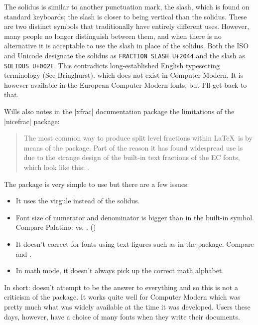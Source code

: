 {The solidus is similar to another punctuation mark, the slash, which is found on standard keyboards; the slash is closer to being vertical than the solidus. These are two distinct symbols that traditionally have entirely different uses. However, many people no longer distinguish between them, and when there is no alternative it is acceptable to use the slash in place of the solidus.
Both the ISO and Unicode designate the solidus as \texttt{FRACTION SLASH U+2044} and the slash as \texttt{SOLIDUS U+002F}. This contradicts long-established English typesetting terminology (See Bringhurst).
  which does not exist in Computer Modern. It is however available in
  the European Computer Modern fonts, but I'll get back to that.

Wills also notes in the |xfrac| documentation package the limitations
of the |nicefrac| package:

\begin{quotation}
  The most common way to produce split level fractions within \LaTeX\
  is by means of the  package. Part of the reason it
  has found widespread use is due to the strange design of the
  built-in text fractions of the EC fonts, which look like this:
  \textonehalf. 
\end{quotation}

The package is very simple to use but there are a few
issues:

 \begin{itemize}
  \item It uses the virgule instead of the solidus.
  \item Font size of numerator and denominator is bigger than in the
    built-in symbol. Compare Palatino: \switch{ppl}{\nicefrac{1}{2}}
    vs. \switch{ppl}{\textonehalf }. (\sfrac{1}{2})

  \item It doesn't correct for fonts using text figures such as in the
    \docpkg{eco} package. Compare \switch{cmor}{\nicefrac{1}{2}} and
    \switch{cmor}{\nicefrac{8}{9}}.
  \item In math mode, it doesn't always pick up the correct math
    alphabet.
 \end{itemize}

In short:  doesn't attempt to be the answer to
everything and so this is not a criticism of the package. It works
quite well for Computer Modern which was pretty much what was widely
available at the time it was developed. Users these days, however,
have a choice of many fonts when they write their documents.

}
